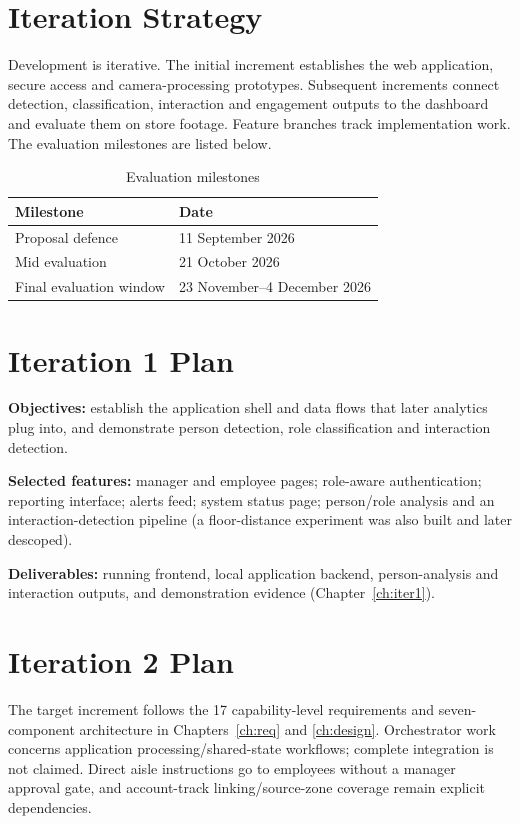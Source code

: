 \section{Iteration Strategy}
Development is iterative. The initial increment establishes the web application, secure access and camera-processing prototypes. Subsequent increments connect detection, classification, interaction and engagement outputs to the dashboard and evaluate them on store footage. Feature branches track implementation work. The evaluation milestones are listed below.
\begin{table}[H]
\centering
\caption{Evaluation milestones}
\begin{tabular}{P{0.40\textwidth}P{0.45\textwidth}}
\toprule
Milestone & Date\\
\midrule
Proposal defence & 11 September 2026\\
Mid evaluation & 21 October 2026\\
Final evaluation window & 23 November--4 December 2026\\
\bottomrule
\end{tabular}
\end{table}

\section{Iteration 1 Plan}
\textbf{Objectives:} establish the application shell and data flows that later analytics plug into, and demonstrate person detection, role classification and interaction detection.

\textbf{Selected features:} manager and employee pages; role-aware authentication; reporting interface; alerts feed; system status page; person/role analysis and an interaction-detection pipeline (a floor-distance experiment was also built and later descoped).

\textbf{Deliverables:} running frontend, local application backend, person-analysis and interaction outputs, and demonstration evidence (Chapter~\ref{ch:iter1}).

\section{Iteration 2 Plan}
The target increment follows the 17 capability-level requirements and seven-component architecture in Chapters~\ref{ch:req} and \ref{ch:design}. Orchestrator work concerns application processing/shared-state workflows; complete integration is not claimed. Direct aisle instructions go to employees without a manager approval gate, and account-track linking/source-zone coverage remain explicit dependencies.

